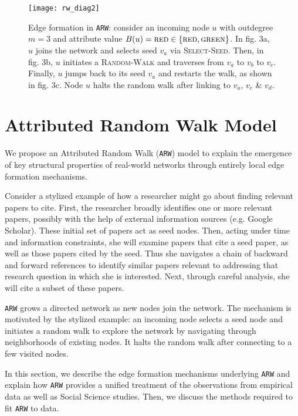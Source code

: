 \begin{figure*}
	\vspace{-20pt}
    \centering
    \texttt{[image: rw\_diag2]}
    \caption{Edge formation in \texttt{ARW}: consider
    an incoming node $u$ with outdegree ${m=3}$ and attribute value {$B(u)=\textsc{red} \in \{\textsc{red},\textsc{green}\}$}.
    In fig. 3a, $u$ joins the network and selects seed $v_a$ via \textsc{Select-Seed}.
    Then, in fig. 3b, $u$ initiates a \textsc{Random-Walk} and traverses from $v_a$ to $v_b$ to $v_c$.
    Finally, $u$ jumps back to its seed $v_a$ and restarts the walk, as shown in fig. 3c.
    Node $u$ halts the random walk after linking to $v_a$, $v_c$ \& $v_d$.
    }
    \label{fig:randomwalk}
	\vspace{-8pt}
\end{figure*}

\section{Attributed Random Walk Model}
\label{sec:Proposed Model}
We propose an Attributed Random Walk (\texttt{ARW}) model to explain the emergence
of key structural properties of real-world networks through {entirely local}
edge formation mechanisms.

Consider a stylized example of how a researcher might go about finding relevant papers to cite. First, the researcher broadly identifies one or more {relevant} papers,
possibly with the help of external information sources (e.g. Google Scholar). These initial set of papers act as seed nodes.  Then, acting under time and information constraints, she will examine papers that cite a seed paper, as well as those papers cited by the seed. Thus she navigates a chain of backward and forward
references to identify {similar} papers relevant to addressing that research question in which she is interested. Next, through careful analysis, she will cite a subset of these papers.

\texttt{ARW} grows a directed network as new nodes join the network. The
mechanism is motivated by the stylized example: an incoming node selects a seed node and initiates a random walk to explore the network by navigating through neighborhoods of existing nodes. It halts the random walk after connecting to a few visited nodes.

In this section, we describe the edge formation mechanisms underlying
\texttt{ARW} and explain how \texttt{ARW} provides a unified treatment of
the observations from empirical data as well as Social Science studies. Then,
we discuss the methods required to fit \texttt{ARW} to data.


